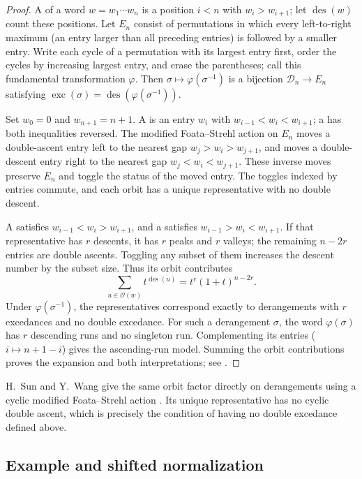 \begin{proof}
A  of a word $w=w_1\dotsm w_n$ is a position $i<n$
with $w_i>w_{i+1}$; let $\operatorname{des}(w)$ count these positions.
Let $E_n$ consist of permutations in which every left-to-right maximum
(an entry larger than all preceding entries) is followed by a smaller entry.
Write each cycle of a permutation with its largest entry first, order the
cycles by increasing largest entry, and erase the parentheses; call this
fundamental transformation $\varphi$.
Then $\sigma\mapsto\varphi(\sigma^{-1})$ is a bijection
$\mathcal{D}_n\to E_n$ satisfying
$\operatorname{exc}(\sigma)=\operatorname{des}(\varphi(\sigma^{-1}))$.

Set $w_0=0$ and $w_{n+1}=n+1$.
A  is an entry $w_i$ with
$w_{i-1}<w_i<w_{i+1}$; a  has both inequalities reversed.
The modified Foata--Strehl action on $E_n$ moves a double-ascent entry left
to the nearest gap $w_j>w_i>w_{j+1}$, and moves a double-descent entry right
to the nearest gap $w_j<w_i<w_{j+1}$.
These inverse moves preserve $E_n$ and toggle the status of the moved entry.
The toggles indexed by entries commute, and each orbit has a unique
representative with no double descent.

A  satisfies $w_{i-1}<w_i>w_{i+1}$, and a 
satisfies $w_{i-1}>w_i<w_{i+1}$.
If that representative has $r$ descents, it has $r$ peaks and $r$ valleys;
the remaining $n-2r$ entries are double ascents.
Toggling any subset of them increases the descent number by the subset size.
Thus its orbit contributes
\[
 \sum_{u\in\mathcal{O}(w)}t^{\operatorname{des}(u)}
 =t^r(1+t)^{n-2r}.
\]
Under $\varphi(\sigma^{-1})$, the representatives correspond exactly to
derangements with $r$ excedances and no double excedance.
For such a derangement $\sigma$, the word $\varphi(\sigma)$ has $r$
descending runs and no singleton run. Complementing its entries
($i\mapsto n+1-i$) gives the ascending-run model.
Summing the orbit contributions proves the expansion and both interpretations;
see \cite[proof of Thm.~1.4, pp.~18--19]{AthanasiadisSavvidou2012}.
\end{proof}

H.~Sun and Y.~Wang give the same orbit factor directly on derangements
using a cyclic modified Foata--Strehl action
\cite[Thm.~5 and Cor.~6]{SunWang2014}.
Its unique representative has no cyclic double ascent, which is precisely
the condition of having no double excedance defined above.

\subsection[oeisA046739Example]{Example and shifted normalization}

